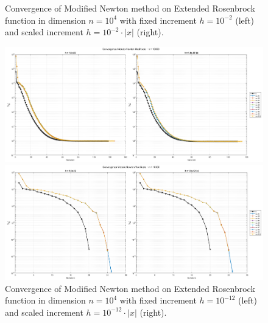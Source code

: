 \documentclass[a4paper,12pt]{article}
\begin{document}
\begin{itemize}
		\newpage
		
		\begin{figure}[H]%
			\caption{Convergence of Modified Newton method on Extended Rosenbrock function in dimension $n = 10^{4}$ with fixed increment $h = 10^{-2}$ (left) and scaled increment $h = 10^{-2}\cdot|x|$ (right).}\label{fig:fd_10k_h2}
			
			\includegraphics[width=\textwidth]{../immagini/ext_10k_h2.png}
			\endminipage\hfill
			\caption{Convergence of Modified Newton method on Extended Rosenbrock function in dimension $n = 10^{4}$ with fixed increment $h = 10^{-12}$ (left) and scaled increment $h = 10^{-12}\cdot|x|$ (right).} 			\label{fig:fd_10k_h12}	
			\includegraphics[width=\textwidth]{../immagini/ext_10k_h12.png}
		
			\endminipage\hfill
		\end{figure}
		
		
		
		
		

\end{itemize}
\end{document}
